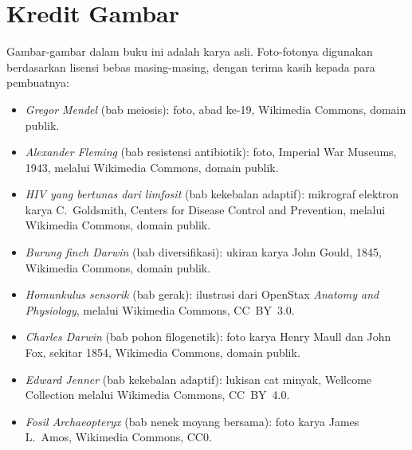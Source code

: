 \chapter*{Kredit Gambar}

\begingroup\sloppy

Gambar-gambar dalam buku ini adalah karya asli. Foto-fotonya digunakan
berdasarkan lisensi bebas masing-masing, dengan terima kasih kepada
para pembuatnya:

\begin{itemize}
  \item \emph{Gregor Mendel} (bab meiosis): foto, abad ke-19,
        Wikimedia Commons, domain publik.
  \item \emph{Alexander Fleming} (bab resistensi antibiotik): foto,
        Imperial War Museums, 1943, melalui Wikimedia Commons, domain
        publik.
  \item \emph{HIV yang bertunas dari limfosit} (bab kekebalan
        adaptif): mikrograf elektron karya C.~Goldsmith, Centers for
        Disease Control and Prevention, melalui Wikimedia Commons,
        domain publik.
  \item \emph{Burung finch Darwin} (bab diversifikasi): ukiran karya
        John Gould, 1845, Wikimedia Commons, domain publik.
  \item \emph{Homunkulus sensorik} (bab gerak): ilustrasi dari
        OpenStax \emph{Anatomy and Physiology}, melalui Wikimedia
        Commons, CC~BY~3.0.
  \item \emph{Charles Darwin} (bab pohon filogenetik): foto karya
        Henry Maull dan John Fox, sekitar 1854, Wikimedia Commons,
        domain publik.
  \item \emph{Edward Jenner} (bab kekebalan adaptif): lukisan cat
        minyak, Wellcome Collection melalui Wikimedia Commons,
        CC~BY~4.0.
  \item \emph{Fosil Archaeopteryx} (bab nenek moyang bersama): foto
        karya James L.~Amos, Wikimedia Commons, CC0.
\end{itemize}

